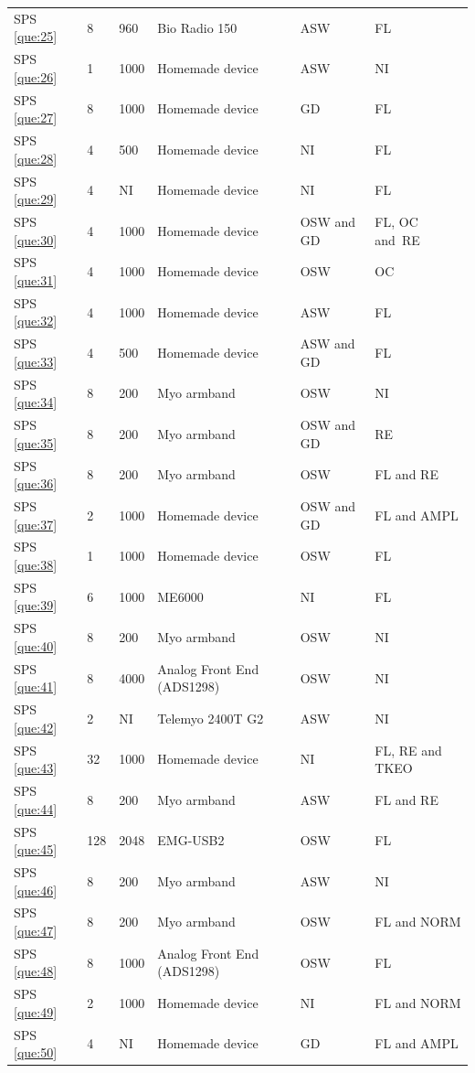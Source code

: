 \documentclass[sensors,review,accept,moreauthors,pdftex]{Definitions/mdpi}
\begin{document}
\begin{table}[H]
\begin{tabular}{m{30pt}m{44pt}m{40pt}m{113pt}m{67pt}m{70pt}}
		SPS \ref{que:25}	&	8	&	960	&	Bio Radio 150& ASW&FL\\
								
		SPS \ref{que:26}	&	1	&	1000	&	Homemade device& ASW&NI\\
								
		SPS \ref{que:27}	&	8	&	1000	&	Homemade device& GD&FL\\
								
		SPS \ref{que:28}	&	4	&	500	&	Homemade device& NI&FL\\
								
		SPS \ref{que:29}	&	4	&	NI	&	Homemade device& NI&FL\\
								
		SPS \ref{que:30}	&	4	&	1000	&	Homemade device& OSW and GD&FL, OC and~RE\\
								
		SPS \ref{que:31}	&	4	&	1000	&	Homemade device& OSW&OC\\
								
		SPS \ref{que:32}	&	4	&	1000	&	Homemade device&  ASW &FL\\
								
		SPS \ref{que:33}	&	4	&	500	&	Homemade device& ASW and GD&FL\\
		
	SPS \ref{que:34}	&	8	&	200	&	Myo armband	&	OSW	&	NI\\	
	SPS \ref{que:35}	&	8	&	200	&	Myo armband	&	OSW and GD	&	RE\\	
	SPS \ref{que:36}	&	8	&	200	&	Myo armband	&	OSW	&	FL and RE\\	
	SPS \ref{que:37}	&	2	&	1000	&	Homemade device	&	OSW and GD	&	FL and AMPL\\	
	SPS \ref{que:38}	&	1	&	1000	&	Homemade device&	OSW	&	FL\\	
	SPS \ref{que:39}	&	6	&	1000	&	ME6000&	NI	&	FL	\\	
	SPS \ref{que:40}	&	8	&	200	&	Myo armband	&	OSW	&	NI\\	
	SPS \ref{que:41}	&	8	&	4000	&	Analog Front End (ADS1298)&	OSW	&	NI	\\	
	SPS \ref{que:42}	&	2	&	NI	&	Telemyo 2400T G2 &	ASW	&	NI	\\	
	SPS \ref{que:43}	&	32	&	1000	&	Homemade device&	NI	&	FL, RE and TKEO	\\	
	SPS \ref{que:44}	&	8	&	200	&	Myo armband&	ASW	&	FL and RE	\\	
	SPS \ref{que:45}	&	128	&	2048	&	EMG-USB2&	OSW	&	FL	\\
	SPS \ref{que:46}	&	8	&	200	&	Myo armband	&	ASW	&	NI	\\	
	SPS \ref{que:47}	&	8	&	200	&	Myo armband &	OSW	&	FL and NORM	\\	
	SPS \ref{que:48}	&	8	&	1000	&	Analog Front End (ADS1298)&	OSW	&	FL	\\	
	SPS \ref{que:49}	&	2	&	1000	&	Homemade device&	NI	&	FL and NORM		\\	
	SPS \ref{que:50}	&	4	&	NI	&	Homemade device&	GD	&	FL and AMPL	\\		
	\bottomrule
	\end{tabular}
	\end{table}
\end{document}

